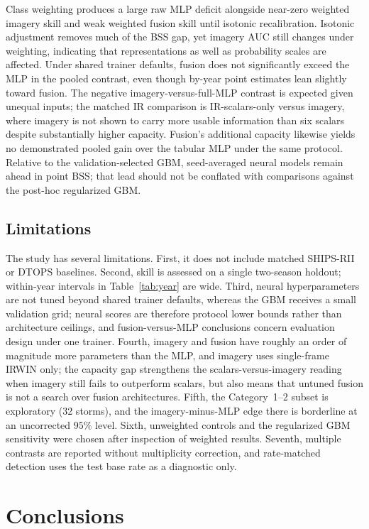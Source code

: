 \documentclass[11pt]{article}
\begin{document}
Class weighting produces a large raw MLP deficit alongside near-zero weighted imagery skill and weak weighted fusion skill until isotonic recalibration. Isotonic adjustment removes much of the BSS gap, yet imagery AUC still changes under weighting, indicating that representations as well as probability scales are affected. Under shared trainer defaults, fusion does not significantly exceed the MLP in the pooled contrast, even though by-year point estimates lean slightly toward fusion. The negative imagery-versus-full-MLP contrast is expected given unequal inputs; the matched IR comparison is IR-scalars-only versus imagery, where imagery is not shown to carry more usable information than six scalars despite substantially higher capacity. Fusion's additional capacity likewise yields no demonstrated pooled gain over the tabular MLP under the same protocol. Relative to the validation-selected GBM, seed-averaged neural models remain ahead in point BSS; that lead should not be conflated with comparisons against the post-hoc regularized GBM.

\subsection{Limitations}

The study has several limitations. First, it does not include matched SHIPS-RII or DTOPS baselines. Second, skill is assessed on a single two-season holdout; within-year intervals in Table~\ref{tab:year} are wide. Third, neural hyperparameters are not tuned beyond shared trainer defaults, whereas the GBM receives a small validation grid; neural scores are therefore protocol lower bounds rather than architecture ceilings, and fusion-versus-MLP conclusions concern evaluation design under one trainer. Fourth, imagery and fusion have roughly an order of magnitude more parameters than the MLP, and imagery uses single-frame IRWIN only; the capacity gap strengthens the scalars-versus-imagery reading when imagery still fails to outperform scalars, but also means that untuned fusion is not a search over fusion architectures. Fifth, the Category~1--2 subset is exploratory (32 storms), and the imagery-minus-MLP edge there is borderline at an uncorrected $95\%$ level. Sixth, unweighted controls and the regularized GBM sensitivity were chosen after inspection of weighted results. Seventh, multiple contrasts are reported without multiplicity correction, and rate-matched detection uses the test base rate as a diagnostic only.

\section{Conclusions}
\label{sec:conclusions}
\end{document}
